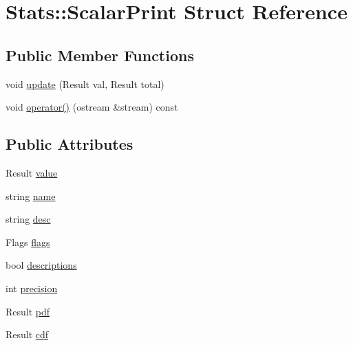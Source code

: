 \hypertarget{structStats_1_1ScalarPrint}{
\section{Stats::ScalarPrint Struct Reference}
\label{structStats_1_1ScalarPrint}
}
\subsection*{Public Member Functions}
\begin{DoxyCompactItemize}
\item 
void \hyperlink{structStats_1_1ScalarPrint_a4b24bfbb86cf2a5f2dee215c7b200482}{update} (Result val, Result total)
\item 
void \hyperlink{structStats_1_1ScalarPrint_aa2f17b2f3ee7c73b6ecff89c7a0dfdc1}{operator()} (ostream \&stream) const 
\end{DoxyCompactItemize}
\subsection*{Public Attributes}
\begin{DoxyCompactItemize}
\item 
Result \hyperlink{structStats_1_1ScalarPrint_a45fe47d5d3b39603727f5641c51ba4fd}{value}
\item 
string \hyperlink{structStats_1_1ScalarPrint_a5be372119c7d55a9d96688aaa060cc79}{name}
\item 
string \hyperlink{structStats_1_1ScalarPrint_a7489ca369b46014bdece1ecb9b90e097}{desc}
\item 
Flags \hyperlink{structStats_1_1ScalarPrint_a920e3f724dce9d9a24810a16ffacb4bb}{flags}
\item 
bool \hyperlink{structStats_1_1ScalarPrint_a738a9523ba5234d01d11127b1dc1eb8d}{descriptions}
\item 
int \hyperlink{structStats_1_1ScalarPrint_a879b6ff384c6685845e308118c0d82d3}{precision}
\item 
Result \hyperlink{structStats_1_1ScalarPrint_acd1df1a0346a2bd5dd90086550663eea}{pdf}
\item 
Result \hyperlink{structStats_1_1ScalarPrint_aeb6a7afaa0bf80f0d8629d9798afc2e3}{cdf}
\end{DoxyCompactItemize}


